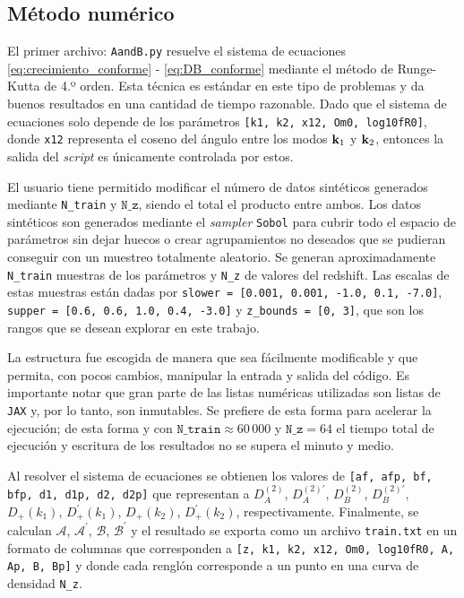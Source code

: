\documentclass[letterpaper, 12pt]{article}
\begin{document}
        \subsection{Método numérico}
            El primer archivo: \texttt{AandB.py} resuelve el sistema de ecuaciones \ref{eq:crecimiento_conforme} - \ref{eq:DB_conforme} mediante el método de Runge-Kutta de 4.º orden. Esta técnica es estándar en este tipo de problemas y da buenos resultados en una cantidad de tiempo razonable. Dado que el sistema de ecuaciones solo depende de los parámetros \texttt{[k1, k2, x12, Om0, log10fR0]}, donde \texttt{x12} representa el coseno del ángulo entre los modos $\vb{k}_1$ y $\vb{k}_2$, entonces la salida del \emph{script} es únicamente controlada por estos.
    
            El usuario tiene permitido modificar el número de datos sintéticos generados mediante \texttt{N\_train} y $\texttt{N\_z}$, siendo el total el producto entre ambos. Los datos sintéticos son generados mediante el \emph{sampler} \texttt{Sobol} para cubrir todo el espacio de parámetros sin dejar huecos o crear agrupamientos no deseados que se pudieran conseguir con un muestreo totalmente aleatorio. Se generan aproximadamente \texttt{N\_train} muestras de los parámetros y \texttt{N\_z} de valores del redshift. Las escalas de estas muestras están dadas por \texttt{slower = [0.001, 0.001, -1.0, 0.1, -7.0]},  \texttt{supper = [0.6, 0.6, 1.0, 0.4, -3.0]} y \texttt{z\_bounds = [0, 3]}, que son los rangos que se desean explorar en este trabajo.

            La estructura fue escogida de manera que sea fácilmente modificable y que permita, con pocos cambios, manipular la entrada y salida del código. Es importante notar que gran parte de las listas numéricas utilizadas son listas de \texttt{JAX} y, por lo tanto, son inmutables. Se prefiere de esta forma para acelerar la ejecución; de esta forma y con $\texttt{N\_train} \approx 60\,000$ y $\texttt{N\_z} = 64$ el tiempo total de ejecución y escritura de los resultados no se supera el minuto y medio.

            Al resolver el sistema de ecuaciones se obtienen los valores de \texttt{[af, afp, bf, bfp, d1, d1p, d2, d2p]} que representan a $D_A^{(2)}$, $D_A^{(2)\prime}$, $D_B^{(2)}$, $D_B^{(2)\prime}$, $D_+(k_1)$, $D_+^{\prime}(k_1)$, $D_+(k_2)$, $D_+^{\prime}(k_2)$, respectivamente. Finalmente, se calculan $\mathcal{A}$, $\mathcal{A}^{\prime}$, $\mathcal{B}$, $\mathcal{B}^{\prime}$ y el resultado se exporta como un archivo \texttt{train.txt} en un formato de columnas que corresponden a \texttt{[z, k1, k2, x12, Om0, log10fR0, A, Ap, B, Bp]} y donde cada renglón corresponde a un punto en una curva de densidad \texttt{N\_z}.
\end{document}
